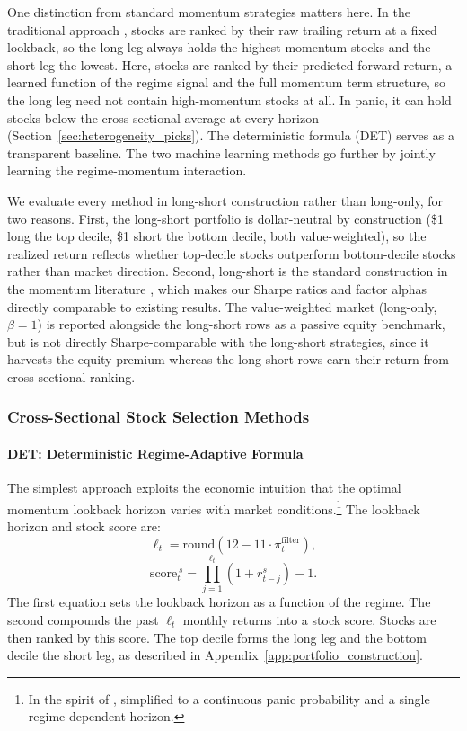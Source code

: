 One distinction from standard momentum strategies matters here. In the traditional approach \citep{JegadeeshTitman1993}, stocks are ranked by their raw trailing return at a fixed lookback, so the long leg always holds the highest-momentum stocks and the short leg the lowest. Here, stocks are ranked by their predicted forward return, a learned function of the regime signal and the full momentum term structure, so the long leg need not contain high-momentum stocks at all. In panic, it can hold stocks below the cross-sectional average at every horizon (Section~\ref{sec:heterogeneity_picks}). The deterministic formula (DET) serves as a transparent baseline. The two machine learning methods go further by jointly learning the regime-momentum interaction.

We evaluate every method in long-short construction rather than long-only, for two reasons. First, the long-short portfolio is dollar-neutral by construction (\$1 long the top decile, \$1 short the bottom decile, both value-weighted), so the realized return reflects whether top-decile stocks outperform bottom-decile stocks rather than market direction. Second, long-short is the standard construction in the momentum literature \citep{JegadeeshTitman1993, DanielMoskowitz2016, BarrosoSantaClara2015}, which makes our Sharpe ratios and factor alphas directly comparable to existing results. The value-weighted market (long-only, $\beta = 1$) is reported alongside the long-short rows as a passive equity benchmark, but is not directly Sharpe-comparable with the long-short strategies, since it harvests the equity premium whereas the long-short rows earn their return from cross-sectional ranking.

\subsubsection{Cross-Sectional Stock Selection Methods}\label{sec:methods}

\paragraph{DET: Deterministic Regime-Adaptive Formula}\label{sec:method0}

The simplest approach exploits the economic intuition that the optimal momentum lookback horizon varies with market conditions.\footnote{In the spirit of \citet{GHM2023}, simplified to a continuous panic probability and a single regime-dependent horizon.} The lookback horizon and stock score are:
\begin{equation}
    \ell_t = \text{round}\!\left(12 - 11 \cdot \pi_t^{\text{filter}}\right),
\end{equation}
\begin{equation}
    \text{score}_{t}^{\,s} = \prod_{j=1}^{\ell_t}(1 + r_{t-j}^s) - 1.
\end{equation}
The first equation sets the lookback horizon as a function of the regime. The second compounds the past $\ell_t$ monthly returns into a stock score. Stocks are then ranked by this score. The top decile forms the long leg and the bottom decile the short leg, as described in Appendix~\ref{app:portfolio_construction}.

